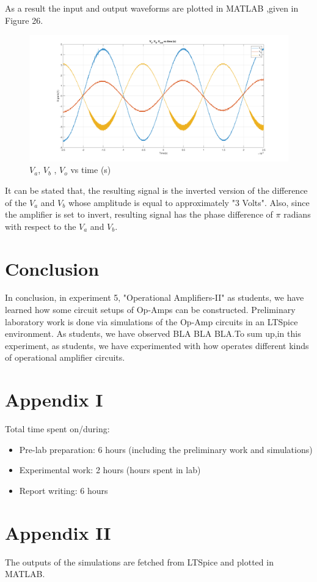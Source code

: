 \documentclass[letterpaper,12pt]{article}
\begin{document}
As a result the input and output waveforms are plotted in MATLAB ,given in Figure 26.
\begin{figure}[H]
	\centering
   \includegraphics[width=1\textwidth]{5.png}
   \caption{\(V_{a}\), \(V_{b}\) , \(V_{o}\) vs time (s)}
\end{figure}
It can be stated that, the resulting signal is the inverted version of the difference of the \(V_a\) and \(V_b\) whose amplitude is equal to approximately "3 Volts". Also, since the amplifier is set to invert, resulting signal has the phase difference of \(\pi \) radians with respect to the \(V_a\) and \(V_b\). 
\section{Conclusion}
In conclusion, in experiment 5, "Operational Amplifiers-II" as students, we have learned how some circuit setups of Op-Amps can be constructed. Preliminary laboratory work is done via simulations of the Op-Amp circuits in an LTSpice environment. As students, we have observed   BLA BLA BLA.To sum up,in this experiment, as students, we have experimented with how operates different kinds of operational amplifier circuits. 
\section*{Appendix I}
Total time spent on/during:
\begin{itemize}
	\item Pre-lab preparation: 6 hours (including the preliminary work and simulations) 
	\item Experimental work: 2 hours (hours spent in lab)
	\item Report writing: 6 hours 
\end{itemize}
\section*{Appendix II}
The outputs of the simulations are fetched from LTSpice and plotted in MATLAB.



\end{document}
